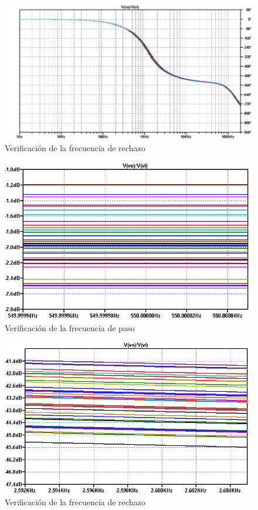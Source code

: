 \begin{figure}[H]
    \centering
    \includegraphics[scale=0.6]{../EJ1/Recursos/bessel_verificacion_fase.png}
    \caption{Verificaci\'on de la frecuencia de rechazo}
\end{figure}

\begin{figure}[H]
    \centering
    \includegraphics[scale=0.6]{../EJ1/Recursos/bessel_verificacion_fp.png}
    \caption{Verificaci\'on de la frecuencia de paso}
\end{figure}

\begin{figure}[H]
    \centering
    \includegraphics[scale=0.6]{../EJ1/Recursos/bessel_verificacion_fa.png}
    \caption{Verificaci\'on de la frecuencia de rechazo}
\end{figure}

